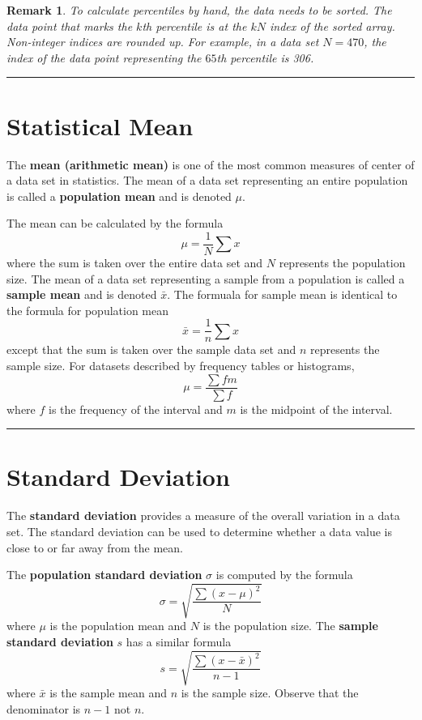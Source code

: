 \documentclass{article}
\newtheorem*{remark}{Remark}
\theoremstyle{definition}
\newcommand{\secend}[0]{\noindent\rule[0.5ex]{\linewidth}{1pt}}
\begin{document}
\begin{remark}
To calculate percentiles by hand, the data needs to be sorted. The
data point that marks the $k$th percentile is at the $kN$ index of the sorted
array. Non-integer indices are rounded up. For example, in a data set $N=470$,
the index of the data point representing the $65$th percentile is 306. 
\end{remark}
\secend

\section*{Statistical Mean}
\begin{definition}
    The \textbf{mean (arithmetic mean)} is one of the most common measures of 
    center of a data set in statistics. The mean of a data set representing an 
    entire population is called a \textbf{population mean} and is denoted $\mu$. 
\end{definition}

\noindent The mean can be calculated by the formula 
\[
    \mu = \frac{1}{N}\sum x
\]
where the sum is taken over the entire data set and $N$ represents the
population size. The mean of a data set representing a sample from a population 
is called a \textbf{sample mean} and is denoted $\bar{x}$. The formuala for 
sample mean is identical to the formula for population mean 
\[
    \bar{x} = \frac{1}{n}\sum x
\]
except that the sum is taken over the sample data set and $n$ represents the
sample size. For datasets described by frequency tables or histograms, 
\[
    \mu = \frac{\sum f m}{\sum f}
\]
where $f$ is the frequency of the interval and $m$ is the midpoint of the
interval. \\
\secend

\section*{Standard Deviation}
\begin{definition}
    The \textbf{standard deviation} provides a measure of the overall variation
    in a data set. The standard deviation can be used to determine whether a
    data value is close to or far away from the mean.
\end{definition}

\noindent The \textbf{population standard deviation} $\sigma$ is computed by the
formula
\[
    \sigma = \sqrt{\frac{\sum(x-\mu)^2}{N}}
\]
where $\mu$ is the population mean and $N$ is the population size. The
\textbf{sample standard deviation} $s$ has a similar formula 
\[
    s = \sqrt{\frac{\sum(x-\bar{x})^2}{n-1}}
\]
where $\bar{x}$ is the sample mean and $n$ is the sample size. Observe that the
denominator is $n-1$ not $n$. 
\end{document}
